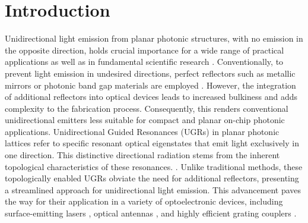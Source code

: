 \documentclass[%
 reprint,
superscriptaddress,
 amsmath,amssymb, aps,
]{revtex4-1}
\begin{document}
\section{Introduction}
Unidirectional light emission from planar photonic structures, with no emission in the opposite direction, holds crucial importance for a wide range of practical applications as well as in fundamental scientific research \cite{HZhou2016,STHa2018}. Conventionally, to prevent light emission in undesired directions, perfect reflectors such as metallic mirrors or photonic band gap materials are employed \cite{Roncone1993,Taillaert2004,YOta2015}. However, the integration of additional reflectors into optical devices leads to increased bulkiness and adds complexity to the fabrication process. Consequently, this renders conventional unidirectional emitters less suitable for compact and planar on-chip photonic applications. Unidirectional Guided Resonances (UGRs) in planar photonic lattices refer to specific resonant optical eigenstates that emit light exclusively in one direction. This distinctive directional radiation stems from the inherent topological characteristics of these resonances. \cite{XYin2020,ZZhang2021,ZZhang2022}. Unlike traditional methods, these topologically enabled UGRs obviate the need for additional reflectors, presenting a streamlined approach for unidirectional light emission. This advancement paves the way for their application in a variety of optoelectronic devices, including surface-emitting lasers \cite{MCYHuang2007,HMatsubara2008,Kodigala2017}, optical antennas \cite{MRaval2017,SKhajavi2021,XZhang2022}, and highly efficient grating couplers \cite{HWang2023,MDai2015,AMichaels2018}.
\end{document}
